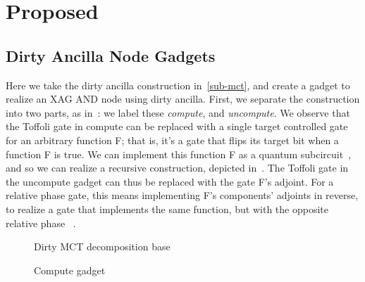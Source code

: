 \section{Proposed}
\label{Pro}

\subsection{Dirty Ancilla Node Gadgets}
\label{sub-synth}
Here we take the dirty ancilla construction in~\ref{sub-mct}, and create a gadget to
realize an XAG AND node using dirty ancilla. First, we separate the construction into
two parts, as in~: we label these \emph{compute}, and \emph{uncompute}.
We observe that the Toffoli gate in compute can be replaced with a single target controlled
gate for an arbitrary function F; that is, it's a gate that flips its target bit when a
function F is true. We can implement this function F as a quantum
subcircuit~\cite{bib-amy-phase-state}, and so we can realize a recursive construction, depicted
in~. The Toffoli gate in the uncompute gadget can thus be replaced with the
gate F's adjoint. For a relative phase gate, this means implementing F's components' adjoints in
reverse, to realize a gate that implements the same function, but with the opposite relative phase
~\cite{bib-maslov-rtof}.

\begin{figure}[t]
  \centering
  \scalebox{1.0} {
    
  }
  \caption{Dirty MCT decomposition base}
  \label{fig-dirt-mct-org}
\end{figure}

\begin{figure}[t]
  \centering
  \scalebox{1.0} {
    
  }
  \caption{Compute gadget}
  \label{fig-compute}
\end{figure}

